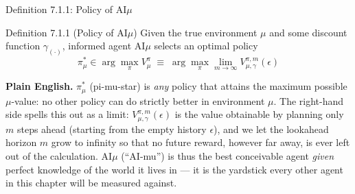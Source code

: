 \documentclass[aspectratio=169,10pt]{beamer}
\begin{document}
\begin{frame}{Definition 7.1.1: Policy of AI$\mu$}
  \begin{block}{Definition 7.1.1 (Policy of AI$\mu$)}
    Given the true environment $\mu$ and some discount function
    $\gamma_{(\cdot)}$, informed agent AI$\mu$ selects an optimal policy
    \[
      \pi_\mu^* \in \arg\max_\pi V_\mu^\pi \;\equiv\; \arg\max_\pi
      \lim_{m\to\infty} V_{\mu,\gamma}^{\pi,m}(\epsilon)
    \]
  \end{block}
  \textbf{Plain English.} $\pi_\mu^*$ (pi-mu-star) is \emph{any} policy that
  attains the maximum possible $\mu$-value: no other policy can do strictly
  better in environment $\mu$. The right-hand side spells this out as a
  limit: $V_{\mu,\gamma}^{\pi,m}(\epsilon)$ is the value obtainable by
  planning only $m$ steps ahead (starting from the empty history
  $\epsilon$), and we let the lookahead horizon $m$ grow to infinity so that
  no future reward, however far away, is ever left out of the calculation.
  AI$\mu$ (``AI-mu'') is thus the best conceivable agent \emph{given}
  perfect knowledge of the world it lives in --- it is the yardstick every
  other agent in this chapter will be measured against.
\end{frame}
\end{document}
